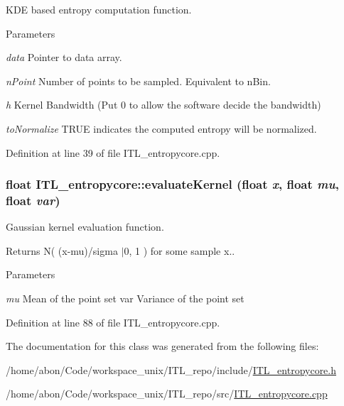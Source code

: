 KDE based entropy computation function. 


\begin{DoxyParams}{Parameters}
\item[{\em data}]Pointer to data array. \item[{\em nPoint}]Number of points to be sampled. Equivalent to nBin. \item[{\em h}]Kernel Bandwidth (Put 0 to allow the software decide the bandwidth) \item[{\em toNormalize}]TRUE indicates the computed entropy will be normalized. \end{DoxyParams}


Definition at line 39 of file ITL\_\-entropycore.cpp.

\hypertarget{classITL__entropycore_a5802a6a76dba25a5afa2b232eb69b9c2}{
\subsubsection[{evaluateKernel}]{\setlength{\rightskip}{0pt plus 5cm}float ITL\_\-entropycore::evaluateKernel (float {\em x}, \/  float {\em mu}, \/  float {\em var})}}
\label{classITL__entropycore_a5802a6a76dba25a5afa2b232eb69b9c2}


Gaussian kernel evaluation function. 

Returns N( (x-\/mu)/sigma $|$0, 1 ) for some sample x.. 
\begin{DoxyParams}{Parameters}
\item[{\em mu}]Mean of the point set  var Variance of the point set \end{DoxyParams}


Definition at line 88 of file ITL\_\-entropycore.cpp.



The documentation for this class was generated from the following files:\begin{DoxyCompactItemize}
\item 
/home/abon/Code/workspace\_\-unix/ITL\_\-repo/include/\hyperlink{ITL__entropycore_8h}{ITL\_\-entropycore.h}\item 
/home/abon/Code/workspace\_\-unix/ITL\_\-repo/src/\hyperlink{ITL__entropycore_8cpp}{ITL\_\-entropycore.cpp}\end{DoxyCompactItemize}

